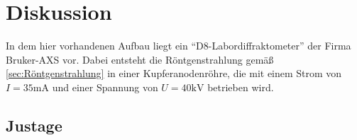 \section{Diskussion}
\label{sec:Diskussion}

In dem hier vorhandenen Aufbau liegt ein \enquote{D8-Labordiffraktometer} der Firma Bruker-AXS vor.
Dabei entsteht die Röntgenstrahlung gemäß \autoref{sec:Röntgenstrahlung} in einer Kupferanodenröhre, die mit einem Strom von $I=35\unit{\milli\ampere}$ 
und einer Spannung von $U = 40 \unit{\kilo\volt}$ betrieben wird.

\subsection{Justage} \label{sec:Justage}
